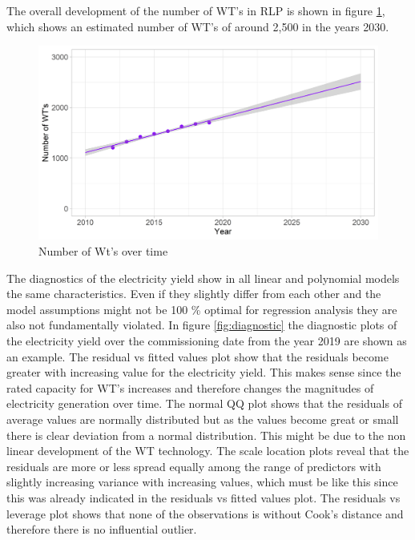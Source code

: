\documentclass[a4paper,11pt]{article}
\begin{document}
The overall development of the number of WT's in RLP is shown in figure \ref{fig:yearswts}, which shows an estimated number of WT's of around 2,500 in the years 2030.
\begin{figure}

{\centering \includegraphics[width=1\linewidth]{data/Amprion/results_of_analysis/year_wts} 

}

\caption{Number of Wt's over time}\label{fig:yearswts}
\end{figure}
The diagnostics of the electricity yield show in all linear and polynomial models the same characteristics. Even if they slightly differ from each other and the model assumptions might not be 100 \% optimal for regression analysis they are also not fundamentally violated. In figure \ref{fig:diagnostic} the diagnostic plots of the electricity yield over the commissioning date from the year 2019 are shown as an example. The residual vs fitted values plot show that the residuals become greater with increasing value for the electricity yield. This makes sense since the rated capacity for WT's increases and therefore changes the magnitudes of electricity generation over time. The normal QQ plot shows that the residuals of average values are normally distributed but as the values become great or small there is clear deviation from a normal distribution. This might be due to the non linear development of the WT technology. The scale location plots reveal that the residuals are more or less spread equally among the range of predictors with slightly increasing variance with increasing values, which must be like this since this was already indicated in the residuals vs fitted values plot. The residuals vs leverage plot shows that none of the observations is without Cook's distance and therefore there is no influential outlier.
\end{document}

